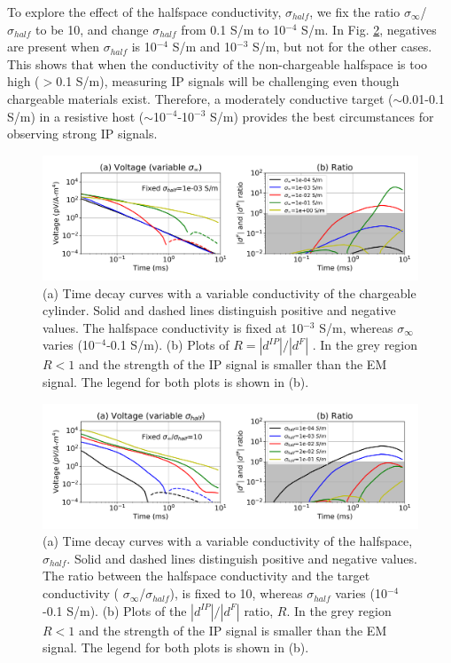 \documentclass[manuscript]{geophysics}
\newcommand{\siginf}{\sigma_\infty}
\newcommand{\dip}{d^{IP}}
\begin{document}
To explore the effect of the halfspace conductivity, $\sigma_{half}$, we fix the ratio $\siginf$/ $\sigma_{half}$ to be 10, and change $\sigma_{half}$ from 0.1 S/m to 10$^{-4}$ S/m. In Fig. \ref{fig:6}, negatives are present when $\sigma_{half}$  is 10$^{-4}$ S/m and 10$^{-3}$ S/m, but not for the other cases. This shows that when the conductivity of the non-chargeable halfspace is too high ($>$0.1 S/m), measuring IP signals will be challenging even though chargeable materials exist. Therefore, a moderately conductive target ($\sim$0.01-0.1 S/m) in a resistive host ($\sim$10$^{-4}$-10$^{-3}$ S/m) provides the best circumstances for observing strong IP signals.

\begin{figure}[htb]
  \centering
  \includegraphics[width=1.0\textwidth]{figures/data_background_1}
  \caption{(a) Time decay curves with a variable conductivity of the chargeable cylinder.  Solid and dashed lines distinguish positive and negative values. The halfspace conductivity is fixed at 10$^{-3}$ S/m, whereas $\siginf$ varies (10$^{-4}$-0.1 S/m).  (b)  Plots of  $R=|\dip|/|d^F|$ . In the grey region $R<1$ and the strength of the IP signal is smaller than the EM signal. The legend for both plots is shown in (b). }
  \label{fig:5}
\end{figure}

\begin{figure}[htb]
  \centering
  \includegraphics[width=1.0\textwidth]{figures/data_background_2}
  \caption{(a) Time decay curves with a variable conductivity of the halfspace, $\sigma_{half}$.  Solid and dashed lines distinguish positive and negative values. The ratio between the halfspace conductivity and the target conductivity ( $\siginf$/$\sigma_{half}$), is fixed to 10, whereas  $\sigma_{half}$ varies (10$^{-4}$-0.1 S/m). (b)  Plots of the $|\dip|/|d^F|$ ratio, $R$. In the grey region $R<1$ and the strength of the IP signal is smaller than the EM signal. The legend for both plots is shown in (b).}
  \label{fig:6}
\end{figure}
\clearpage
\end{document}
